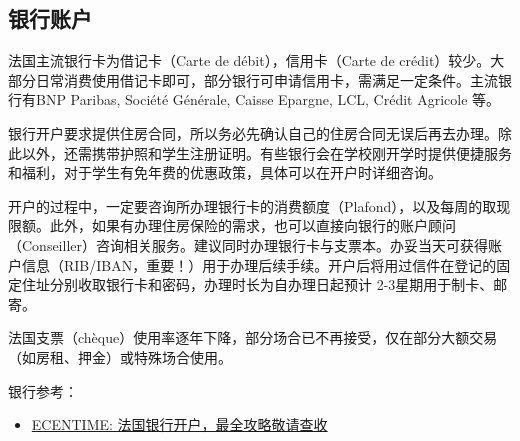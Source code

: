 \subsection{银行账户}

法国主流银行卡为借记卡（Carte de débit），信用卡（Carte de crédit）较少。大部分日常消费使用借记卡即可，部分银行可申请信用卡，需满足一定条件。主流银行有BNP Paribas, Société Générale, Caisse Epargne, LCL, Crédit Agricole 等。

银行开户要求提供住房合同，所以务必先确认自己的住房合同无误后再去办理。除此以外，还需携带护照和学生注册证明。有些银行会在学校刚开学时提供便捷服务和福利，对于学生有免年费的优惠政策，具体可以在开户时详细咨询。

开户的过程中，一定要咨询所办理银行卡的消费额度（Plafond），以及每周的取现限额。此外，如果有办理住房保险的需求，也可以直接向银行的账户顾问（Conseiller）咨询相关服务。建议同时办理银行卡与支票本。办妥当天可获得账户信息（RIB/IBAN，重要！）用于办理后续手续。开户后将用过信件在登记的固定住址分别收取银行卡和密码，办理时长为自办理日起预计 2-3星期用于制卡、邮寄。

法国支票（chèque）使用率逐年下降，部分场合已不再接受，仅在部分大额交易（如房租、押金）或特殊场合使用。

银行参考：
\begin{itemize}
    \item \href{https://www.ecentime.com/article/creation-compte-bancaire}{ECENTIME: 法国银行开户，最全攻略敬请查收}
\end{itemize}
